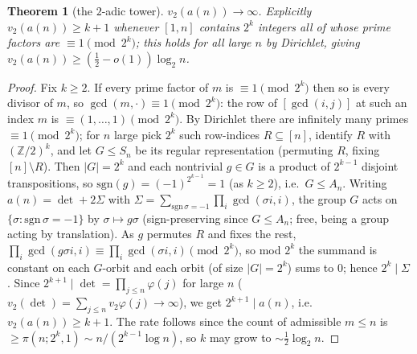 \documentclass[11pt]{article}
\newtheorem{theorem}{Theorem}
\theoremstyle{remark}\newtheorem{remark}[theorem]{Remark}
\begin{document}
\begin{theorem}[the $2$-adic tower]\label{thm:v2}
$v_2(a(n))\to\infty$. Explicitly $v_2(a(n))\ge k+1$ whenever $[1,n]$ contains
$2^k$ integers all of whose prime factors are $\equiv1\pmod{2^k}$; this holds for
all large $n$ by Dirichlet, giving $v_2(a(n))\ge(\tfrac12-o(1))\log_2 n$.
\end{theorem}
\begin{proof}
Fix $k\ge2$. If every prime factor of $m$ is $\equiv1\pmod{2^k}$ then so is every
divisor of $m$, so $\gcd(m,\cdot)\equiv1\pmod{2^k}$: the row of $[\gcd(i,j)]$ at
such an index $m$ is $\equiv(1,\dots,1)\pmod{2^k}$. By Dirichlet there are
infinitely many primes $\equiv1\pmod{2^k}$; for $n$ large pick $2^k$ such
row-indices $R\subseteq[n]$, identify $R$ with $(\mathbb Z/2)^k$, and let
$G\le S_n$ be its regular representation (permuting $R$, fixing $[n]\setminus R$).
Then $|G|=2^k$ and each nontrivial $g\in G$ is a product of $2^{k-1}$ disjoint
transpositions, so $\mathrm{sgn}(g)=(-1)^{2^{k-1}}=1$ (as $k\ge2$), i.e.\ $G\le A_n$.
Writing $a(n)=\det+2\Sigma$ with $\Sigma=\sum_{\mathrm{sgn}\,\sigma=-1}
\prod_i\gcd(\sigma i,i)$, the group $G$ acts on $\{\sigma:\mathrm{sgn}\,\sigma=-1\}$
by $\sigma\mapsto g\sigma$ (sign-preserving since $G\le A_n$; free, being a group
acting by translation). As $g$ permutes $R$ and fixes the rest,
$\prod_i\gcd(g\sigma i,i)\equiv\prod_i\gcd(\sigma i,i)\pmod{2^k}$, so mod $2^k$ the
summand is constant on each $G$-orbit and each orbit (of size $|G|=2^k$) sums to
$0$; hence $2^k\mid\Sigma$. Since $2^{k+1}\mid\det=\prod_{j\le n}\varphi(j)$ for
large $n$ ($v_2(\det)=\sum_{j\le n}v_2\varphi(j)\to\infty$), we get
$2^{k+1}\mid a(n)$, i.e.\ $v_2(a(n))\ge k+1$. The rate follows since the count of
admissible $m\le n$ is $\ge\pi(n;2^k,1)\sim n/(2^{k-1}\log n)$, so $k$ may grow to
$\sim\tfrac12\log_2 n$.
\end{proof}
\end{document}
